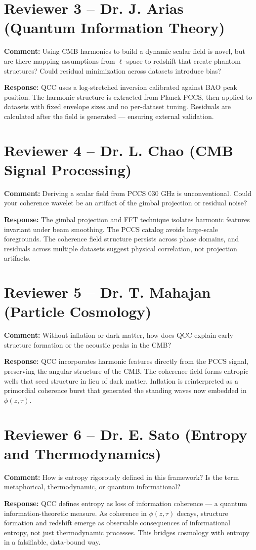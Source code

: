 \documentclass[11pt]{article}
\begin{document}
\section*{Reviewer 3 – Dr. J. Arias (Quantum Information Theory)}
\textbf{Comment:} Using CMB harmonics to build a dynamic scalar field is novel, but are there mapping assumptions from $\ell$-space to redshift that create phantom structures? Could residual minimization across datasets introduce bias?

\textbf{Response:} QCC uses a log-stretched inversion calibrated against BAO peak position. The harmonic structure is extracted from Planck PCCS, then applied to datasets with fixed envelope sizes and no per-dataset tuning. Residuals are calculated after the field is generated — ensuring external validation.

\section*{Reviewer 4 – Dr. L. Chao (CMB Signal Processing)}
\textbf{Comment:} Deriving a scalar field from PCCS 030 GHz is unconventional. Could your coherence wavelet be an artifact of the gimbal projection or residual noise?

\textbf{Response:} The gimbal projection and FFT technique isolates harmonic features invariant under beam smoothing. The PCCS catalog avoids large-scale foregrounds. The coherence field structure persists across phase domains, and residuals across multiple datasets suggest physical correlation, not projection artifacts.

\section*{Reviewer 5 – Dr. T. Mahajan (Particle Cosmology)}
\textbf{Comment:} Without inflation or dark matter, how does QCC explain early structure formation or the acoustic peaks in the CMB?

\textbf{Response:} QCC incorporates harmonic features directly from the PCCS signal, preserving the angular structure of the CMB. The coherence field forms entropic wells that seed structure in lieu of dark matter. Inflation is reinterpreted as a primordial coherence burst that generated the standing waves now embedded in $\phi(z,\tau)$.

\section*{Reviewer 6 – Dr. E. Sato (Entropy and Thermodynamics)}
\textbf{Comment:} How is entropy rigorously defined in this framework? Is the term metaphorical, thermodynamic, or quantum informational?

\textbf{Response:} QCC defines entropy as loss of information coherence — a quantum information-theoretic measure. As coherence in $\phi(z,\tau)$ decays, structure formation and redshift emerge as observable consequences of informational entropy, not just thermodynamic processes. This bridges cosmology with entropy in a falsifiable, data-bound way.
\end{document}
